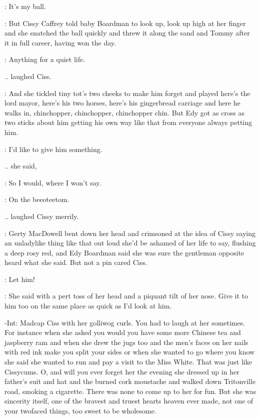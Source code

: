 \tommy:
It's my ball.

:
But Cissy Caffrey told baby Boardman to look up, look up high at her
finger and she snatched the ball quickly and threw it along the sand and
Tommy after it in full career, having won the day.

\cissy:
Anything for a quiet life.

.. laughed Ciss.

:
And she tickled tiny tot's two cheeks to make him forget and played here's
the lord mayor, here's his two horses, here's his gingerbread carriage
and here he walks in, chinchopper, chinchopper, chinchopper chin. But Edy
got as cross as two sticks about him getting his own way like that from
everyone always petting him.

\edy:
I'd like to give him something.

.. she said,

\edy:
So I would, where I won't say.

\cissy:
On the beeoteetom.

.. laughed Cissy merrily.

:
Gerty MacDowell bent down her head and crimsoned at the idea of Cissy
saying an unladylike thing like that out loud she'd be ashamed of her
life to say, flushing a deep rosy red, and Edy Boardman said she was sure
the gentleman opposite heard what she said. But not a pin cared Ciss.

\cissy:
Let him!

:
She said with a pert toss of her head and a piquant tilt of her
nose. Give it to him too on the same place as quick as I'd look at him.

\gerty-Int:
Madcap Ciss with her golliwog curls. You had to laugh at her
sometimes. For instance when she asked you would you have some more
Chinese tea and jaspberry ram and when she drew the jugs too and the men's
faces on her nails with red ink make you split your sides or when she
wanted to go where you know she said she wanted to run and pay a visit to
the Miss White. That was just like Cissycums. O, and will you ever forget
her the evening she dressed up in her father's suit and hat and the burned
cork moustache and walked down Tritonville road, smoking a cigarette.
There was none to come up to her for fun. But she was sincerity itself,
one of the bravest and truest hearts heaven ever made, not one of your
twofaced things, too sweet to be wholesome.

